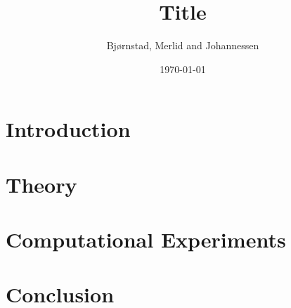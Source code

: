 \documentclass[aps,rmp,reprint,amsmath,amssymb,longbibliography,twocolumn,floatfix]{revtex4-1}
\begin{document}
\title{Title}

\author{Bjørnstad, Merlid and Johannessen}
\date{\today}


\begin{abstract}

\end{abstract}
\maketitle

\tableofcontents

\section{Introduction}
\label{sec:introduction}

\section{Theory}


\section{Computational Experiments}

\section{Conclusion}

\newpage

\appendix

\end{document}
